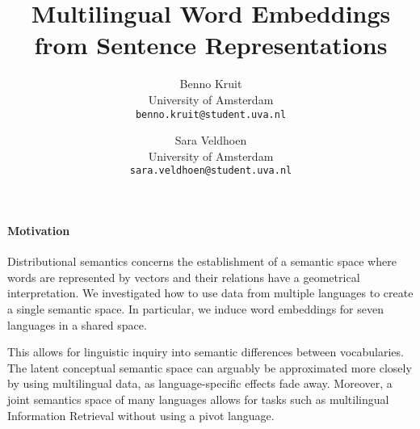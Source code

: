 \documentclass[a4paper,11pt]{article}
\title{Multilingual Word Embeddings from Sentence Representations}
\date{}
\author{Benno Kruit\\
       University of Amsterdam\\
       \texttt{benno.kruit@student.uva.nl}
  \and Sara Veldhoen\\
       University of Amsterdam\\
       \texttt{sara.veldhoen@student.uva.nl}
}
\begin{document}
\maketitle
\thispagestyle{empty}
\pagestyle{empty}


\paragraph{Motivation}



Distributional semantics concerns the establishment of a semantic space where words are represented by vectors and their relations have a geometrical interpretation. We investigated how to use data from multiple languages to create a single semantic space. In particular, we induce word embeddings for seven languages in a shared space.  

This allows for linguistic inquiry into semantic differences between vocabularies. The latent conceptual semantic space can arguably be approximated more closely by using multilingual data, as language-specific effects fade away. 
Moreover, a joint semantics space of many languages allows for tasks such as multilingual Information Retrieval without using a pivot language.



\end{document}
